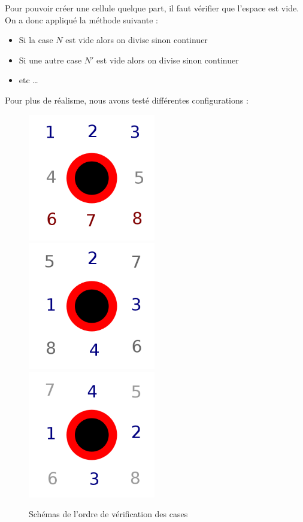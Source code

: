   Pour pouvoir créer une cellule quelque part, il faut vérifier que l'espace est vide. On a donc appliqué la méthode suivante : \begin{itemize} \item Si la case $N$ est vide alors on divise sinon continuer 
            \item Si une autre case $N'$ est vide alors on divise sinon continuer
            \item etc … 
            \end{itemize}
  Pour plus de réalisme, nous avons testé différentes configurations : 
    \begin{figure}[H]
      \centering
      \includegraphics[width=15em]{Images/div_1.png}
      \includegraphics[width=15em]{Images/div_2.png}
      \includegraphics[width=15em]{Images/div_3.png}
      \caption{Schémas de l'ordre de vérification des cases}
    \end{figure}
  

